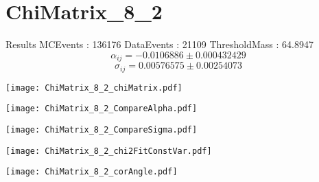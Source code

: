 \documentclass[a4paper,12pt]{article}
\begin{document}
\section{ChiMatrix\_8\_2}
\begin{minipage}{0.49\linewidth} Results \newline
MCEvents : 136176\newline
DataEvents : 21109 \newline
ThresholdMass : 64.8947\\
$$\alpha_{ij} = -0.0106886\pm 0.000432429$$
$$\sigma_{ij} = 0.00576575\pm 0.00254073$$
\end{minipage}\hfill
\begin{minipage}{0.49\linewidth} 
\texttt{[image: ChiMatrix\_8\_2\_chiMatrix.pdf]}\\
\end{minipage}
\hfill
\begin{minipage}{0.49\linewidth} 
\texttt{[image: ChiMatrix\_8\_2\_CompareAlpha.pdf]}\\
\end{minipage}
\hfill
\begin{minipage}{0.49\linewidth} 
\texttt{[image: ChiMatrix\_8\_2\_CompareSigma.pdf]}\\
\end{minipage}
\begin{minipage}{0.49\linewidth} 
\texttt{[image: ChiMatrix\_8\_2\_chi2FitConstVar.pdf]}\\
\end{minipage}
\hfill
\begin{minipage}{0.49\linewidth} 
\texttt{[image: ChiMatrix\_8\_2\_corAngle.pdf]}\\
\end{minipage}
\end{document}
